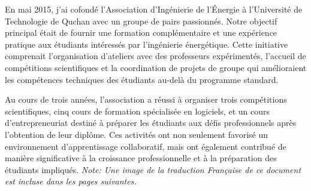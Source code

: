 \documentclass{article}
\begin{document}
    \par
    En mai 2015, j'ai cofondé l'Association d'Ingénierie de l'Énergie à l'Université de Technologie de Quchan avec un groupe de pairs passionnés. Notre objectif principal était de fournir une formation complémentaire et une expérience pratique aux étudiants intéressés par l'ingénierie énergétique. Cette initiative comprenait l'organisation d'ateliers avec des professeurs expérimentés, l'accueil de compétitions scientifiques et la coordination de projets de groupe qui amélioraient les compétences techniques des étudiants au-delà du programme standard.

    Au cours de trois années, l'association a réussi à organiser trois compétitions scientifiques, cinq cours de formation spécialisée en logiciels, et un cours d'entrepreneuriat destiné à préparer les étudiants aux défis professionnels après l'obtention de leur diplôme. Ces activités ont non seulement favorisé un environnement d'apprentissage collaboratif, mais ont également contribué de manière significative à la croissance professionnelle et à la préparation des étudiants impliqués.
    \newline
    \newline
    \textit {Note: Une image de la traduction Française de ce document est incluse dans les pages suivantes.}
    \newline
    \newline

    \newpage
\end{document}
